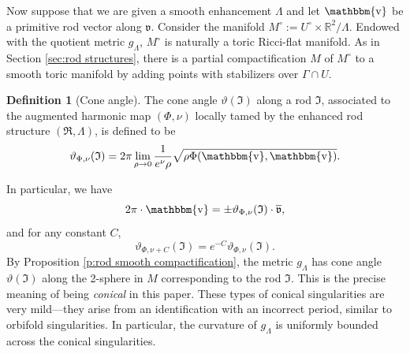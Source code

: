 \documentclass[a4paper,11pt]{amsart}
\theoremstyle{definition}
\newtheorem{definition}[theorem]{Definition}
\numberwithin{equation}{section}
\newcommand{\mv} {\mathfrak v}
\newcommand{\mI} {\mathfrak I}
\newcommand{\mR} {\mathfrak R}
\DeclareMathOperator{\bbv}{\mathbbm{v}}
\begin{document}
 Now suppose that we are given a smooth enhancement $\Lambda$ and let  $\bbv$ be a primitive rod vector along  $\mv$. Consider the manifold $M^\circ:= U^\circ\times \mathbb R^2/\Lambda$. Endowed with the quotient metric $g_\Lambda$, $M^\circ$ is naturally a toric Ricci-flat manifold. As in Section \ref{sec:rod structures}, there is a partial compactification $M$ of $M^\circ$ to a smooth toric manifold by adding points with stabilizers over $\Gamma\cap U$.
\begin{definition}[Cone angle] \label{def:cone angle}
	The cone angle $\vartheta(\mI)$ along a rod $\mI$, associated to the augmented harmonic map $(\Phi, \nu)$ locally tamed by  the enhanced rod structure $(\mR, \Lambda)$, is defined to be 
	$$\vartheta_{\Phi, \nu}(\mI)=2\pi\lim_{\rho\rightarrow 0}\frac{1}{e^\nu\rho}\sqrt{\rho \Phi(\bbv, \bbv)}.$$
    \end{definition}
In particular, we have $$2\pi\cdot\bbv=\pm\vartheta_{\Phi, \nu}(\mI)\cdot \overline{\mv},$$ and  for any constant $C$,
$$\vartheta_{\Phi, \nu+C}(\mI)=e^{-C}\vartheta_{\Phi, \nu}(\mI).$$
 By Proposition \ref{p:rod smooth compactification}, the metric $g_\Lambda$  has cone angle $\vartheta(\mI)$ along the 2-sphere in $M$ corresponding to the rod $\mI$. This is the precise meaning of being \emph{conical} in this paper. These types of conical singularities are very mild—they arise from an identification with an incorrect period, similar to orbifold singularities.  In particular,  the curvature of $g_\Lambda$ is uniformly bounded across the conical singularities. 



\
\end{document}
